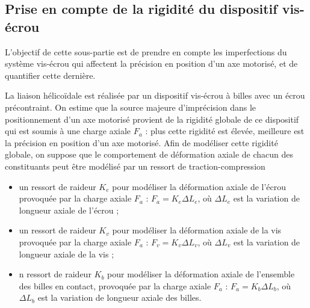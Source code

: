 \ifprof
\begin{corrige}
\end{corrige}
\else
\fi

\subsection{Prise en compte de la rigidité du dispositif vis-écrou}
\begin{obj}
L’objectif de cette sous-partie est de prendre en compte les imperfections du système vis-écrou qui
affectent la précision en position d’un axe motorisé, et de quantifier cette dernière.
\end{obj}

La liaison hélicoïdale est réalisée par un dispositif vis-écrou à billes avec un écrou précontraint. On estime que
la source majeure d’imprécision dans le positionnement d’un axe motorisé provient de la rigidité globale de
ce dispositif qui est soumis à une charge axiale $F_a$ : plus cette rigidité est élevée, meilleure est la précision
en position d’un axe motorisé. Afin de modéliser cette rigidité globale, on suppose que le comportement de
déformation axiale de chacun des constituants peut être modélisé par un ressort de traction-compression
\begin{itemize}
\item un ressort de raideur $K_e$ pour modéliser la déformation axiale de l’écrou provoquée par la charge axiale
$F_a$ : $F_a = K_e \Delta L_e$,  où $\Delta L_e$ est la variation de longueur axiale de l’écrou ;
\item un ressort de raideur $K_v$ pour modéliser la déformation axiale de la vis provoquée par la charge axiale $F_a$ : $F_v = K_v \Delta L_v$,  où $\Delta L_v$ est la variation de longueur axiale de la vis ;
\item n ressort de raideur $K_b$ pour modéliser la déformation axiale de l’ensemble des billes en contact, provoquée par la charge axiale $F_a$ : $F_a = K_b \Delta L_b$,  où $\Delta L_b$ est la variation de longueur axiale des billes.
\end{itemize}

